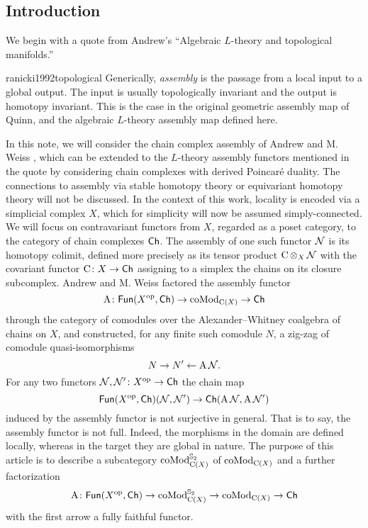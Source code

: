 
\subsection{Introduction}\label{ss:introduction}

We begin with a quote from Andrew's ``Algebraic $L$-theory and topological manifolds.''
\begin{displaycquote}{ranicki1992topological}
	Generically, \textit{assembly} is the passage from a local input to a global output.
	The input is usually topologically invariant and the output is homotopy invariant.
	This is the case in the original geometric assembly map of Quinn, and the algebraic $L$-theory assembly map defined here.
\end{displaycquote}
In this note, we will consider the chain complex assembly of Andrew and M. Weiss \cite{ranicki1990assembly}, which can be extended to the $L$-theory assembly functors mentioned in the quote by considering chain complexes with derived Poincar\'e duality.
The connections to assembly via stable homotopy theory \cite{weiss1995asssembly} or equivariant homotopy theory \cite{davis1998assembly} will not be discussed.
In the context of this work, locality is encoded via a simplicial complex $X$, which for simplicity will now be assumed simply-connected.
We will focus on contravariant functors from $X$, regarded as a poset category, to the category of chain complexes $\mathsf{Ch}$.
The assembly of one such functor $\mathcal{N}$ is its homotopy colimit, defined more precisely as its tensor product $\operatorname{C} \operatorname*{\otimes}_X \mathcal{N}$ with the covariant functor $\operatorname{C} \colon X \to \mathsf{Ch}$ assigning to a simplex the chains on its closure subcomplex.
Andrew and M. Weiss factored the assembly functor
\[
\operatorname{A} \colon \mathsf{Fun}(X^{\mathrm{op}}, \mathsf{Ch}) \to \operatorname{coMod}_{\operatorname{C}(X)} \to \mathsf{Ch}
\]
through the category of comodules over the Alexander--Whitney coalgebra of chains on $X$, and constructed, for any finite such comodule $N$, a zig-zag of comodule quasi-isomorphisms
\[
N \to N' \leftarrow \operatorname{A} \mathcal{N}.
\]
For any two functors $\mathcal{N},\mathcal{N}' \colon X^{\mathrm{op}} \to \mathsf{Ch}$ the chain map
\[
\mathsf{Fun}(X^{\mathrm{op}},\mathsf{Ch})(\mathcal{N},\mathcal{N}') \to \mathsf{Ch}(\operatorname{A} \mathcal{N}, \operatorname{A} \mathcal{N}')
\]
induced by the assembly functor is not surjective in general.
That is to say, the assembly functor is not full.
Indeed, the morphisms in the domain are defined locally, whereas in the target they are global in nature.
The purpose of this article is to describe a subcategory $\operatorname{coMod}^{\mathbb{S}_2}_{\operatorname{C}(X)}$ of $\operatorname{coMod}_{\operatorname{C}(X)}$ and a further factorization
\[
\operatorname{A} \colon \mathsf{Fun}(X^{\mathrm{op}}, \mathsf{Ch}) \to
\operatorname{coMod}^{\mathbb{S}_2}_{\operatorname{C}(X)} \to
\operatorname{coMod}_{\operatorname{C}(X)} \to
\mathsf{Ch}
\]
with the first arrow a fully faithful functor.

